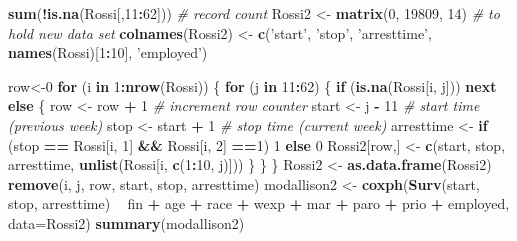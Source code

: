 \documentclass[]{book}
\newenvironment{Shaded}{\begin{snugshade}}{\end{snugshade}}
\newcommand{\CommentTok}[1]{\textcolor[rgb]{0.56,0.35,0.01}{\textit{#1}}}
\newcommand{\ControlFlowTok}[1]{\textcolor[rgb]{0.13,0.29,0.53}{\textbf{#1}}}
\newcommand{\DataTypeTok}[1]{\textcolor[rgb]{0.13,0.29,0.53}{#1}}
\newcommand{\DecValTok}[1]{\textcolor[rgb]{0.00,0.00,0.81}{#1}}
\newcommand{\KeywordTok}[1]{\textcolor[rgb]{0.13,0.29,0.53}{\textbf{#1}}}
\newcommand{\NormalTok}[1]{#1}
\newcommand{\OperatorTok}[1]{\textcolor[rgb]{0.81,0.36,0.00}{\textbf{#1}}}
\newcommand{\StringTok}[1]{\textcolor[rgb]{0.31,0.60,0.02}{#1}}
\begin{document}
\begin{Shaded}
\begin{Highlighting}[]
\KeywordTok{sum}\NormalTok{(}\OperatorTok{!}\KeywordTok{is.na}\NormalTok{(Rossi[,}\DecValTok{11}\OperatorTok{:}\DecValTok{62}\NormalTok{])) }\CommentTok{# record count}
\NormalTok{Rossi2 <-}\StringTok{ }\KeywordTok{matrix}\NormalTok{(}\DecValTok{0}\NormalTok{, }\DecValTok{19809}\NormalTok{, }\DecValTok{14}\NormalTok{) }\CommentTok{# to hold new data set}
\KeywordTok{colnames}\NormalTok{(Rossi2) <-}\StringTok{ }\KeywordTok{c}\NormalTok{(}\StringTok{'start'}\NormalTok{, }\StringTok{'stop'}\NormalTok{, }\StringTok{'arresttime'}\NormalTok{, }\KeywordTok{names}\NormalTok{(Rossi)[}\DecValTok{1}\OperatorTok{:}\DecValTok{10}\NormalTok{], }\StringTok{'employed'}\NormalTok{)}

\NormalTok{row<-}\DecValTok{0}
\ControlFlowTok{for}\NormalTok{ (i }\ControlFlowTok{in} \DecValTok{1}\OperatorTok{:}\KeywordTok{nrow}\NormalTok{(Rossi)) \{ }
    \ControlFlowTok{for}\NormalTok{ (j }\ControlFlowTok{in} \DecValTok{11}\OperatorTok{:}\DecValTok{62}\NormalTok{) \{ }
        \ControlFlowTok{if}\NormalTok{ (}\KeywordTok{is.na}\NormalTok{(Rossi[i, j])) }\ControlFlowTok{next}
        \ControlFlowTok{else}\NormalTok{ \{}
\NormalTok{            row <-}\StringTok{ }\NormalTok{row }\OperatorTok{+}\StringTok{ }\DecValTok{1} \CommentTok{# increment row counter}
\NormalTok{            start <-}\StringTok{ }\NormalTok{j }\OperatorTok{-}\StringTok{ }\DecValTok{11} \CommentTok{# start time (previous week)}
\NormalTok{            stop <-}\StringTok{ }\NormalTok{start }\OperatorTok{+}\StringTok{ }\DecValTok{1} \CommentTok{# stop time (current week)}
\NormalTok{            arresttime <-}\StringTok{ }\ControlFlowTok{if}\NormalTok{ (stop }\OperatorTok{==}\StringTok{ }\NormalTok{Rossi[i, }\DecValTok{1}\NormalTok{] }\OperatorTok{&&}\StringTok{ }\NormalTok{Rossi[i, }\DecValTok{2}\NormalTok{] }\OperatorTok{==}\DecValTok{1}\NormalTok{) }\DecValTok{1} \ControlFlowTok{else} \DecValTok{0}
\NormalTok{            Rossi2[row,] <-}\StringTok{ }\KeywordTok{c}\NormalTok{(start, stop, arresttime, }\KeywordTok{unlist}\NormalTok{(Rossi[i, }\KeywordTok{c}\NormalTok{(}\DecValTok{1}\OperatorTok{:}\DecValTok{10}\NormalTok{, j)]))}
\NormalTok{            \}}
\NormalTok{        \}}
\NormalTok{\}}
\NormalTok{Rossi2 <-}\StringTok{ }\KeywordTok{as.data.frame}\NormalTok{(Rossi2)}
\KeywordTok{remove}\NormalTok{(i, j, row, start, stop, arresttime)}
\NormalTok{modallison2 <-}\StringTok{ }\KeywordTok{coxph}\NormalTok{(}\KeywordTok{Surv}\NormalTok{(start, stop, arresttime) }\OperatorTok{~}\StringTok{ }\NormalTok{fin }\OperatorTok{+}\StringTok{ }\NormalTok{age }\OperatorTok{+}\StringTok{ }\NormalTok{race }\OperatorTok{+}\StringTok{ }\NormalTok{wexp }\OperatorTok{+}\StringTok{ }\NormalTok{mar }\OperatorTok{+}\StringTok{ }\NormalTok{paro }\OperatorTok{+}\StringTok{ }\NormalTok{prio }\OperatorTok{+}\StringTok{ }\NormalTok{employed, }\DataTypeTok{data=}\NormalTok{Rossi2)}
\KeywordTok{summary}\NormalTok{(modallison2)}
\end{Highlighting}
\end{Shaded}
\end{document}
